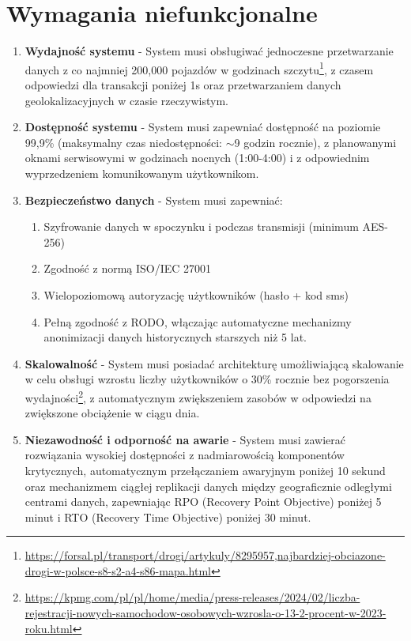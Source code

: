 \section{Wymagania niefunkcjonalne}

\begin{enumerate}
    \item \textbf{Wydajność systemu} - System musi obsługiwać jednoczesne przetwarzanie danych z co najmniej 200,000 pojazdów w godzinach szczytu\footnote{\url{https://forsal.pl/transport/drogi/artykuly/8295957,najbardziej-obciazone-drogi-w-polsce-s8-s2-a4-s86-mapa.html}}, z czasem odpowiedzi dla transakcji poniżej 1s oraz przetwarzaniem danych geolokalizacyjnych w czasie rzeczywistym.

    \item \textbf{Dostępność systemu} - System musi zapewniać dostępność na poziomie 99,9\% (maksymalny czas niedostępności: $\sim$9 godzin rocznie), z planowanymi oknami serwisowymi w godzinach nocnych (1:00-4:00) i z odpowiednim wyprzedzeniem komunikowanym użytkownikom.

    \item \textbf{Bezpieczeństwo danych} - System musi zapewniać:
    \begin{enumerate}
        \item Szyfrowanie danych w spoczynku i podczas transmisji (minimum AES-256)
        \item Zgodność z normą ISO/IEC 27001
        \item Wielopoziomową autoryzację użytkowników (hasło + kod sms)
        \item Pełną zgodność z RODO, włączając automatyczne mechanizmy anonimizacji danych historycznych starszych niż 5 lat.
    \end{enumerate}

    \item \textbf{Skalowalność} - System musi posiadać architekturę umożliwiającą skalowanie w celu obsługi wzrostu liczby użytkowników o 30\% rocznie bez pogorszenia wydajności\footnote{\url{https://kpmg.com/pl/pl/home/media/press-releases/2024/02/liczba-rejestracji-nowych-samochodow-osobowych-wzrosla-o-13-2-procent-w-2023-roku.html}}, z automatycznym zwiększeniem zasobów w odpowiedzi na zwiększone obciążenie w ciągu dnia.

    \item \textbf{Niezawodność i odporność na awarie} - System musi zawierać rozwiązania wysokiej dostępności z nadmiarowością komponentów krytycznych, automatycznym przełączaniem awaryjnym poniżej 10 sekund oraz mechanizmem ciągłej replikacji danych między geograficznie odległymi centrami danych, zapewniając RPO (Recovery Point Objective) poniżej 5 minut i RTO (Recovery Time Objective) poniżej 30 minut.


\end{enumerate}
